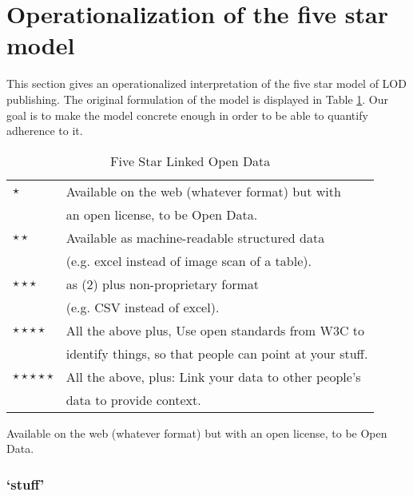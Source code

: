 \section{Operationalization of the five star model}
\label{sec:operationalization}

This section gives an operationalized interpretation of
 the five star model of LOD publishing.
The original formulation of the model \cite{Bernerslee2006}
 is displayed in Table \ref{tab:five_star}.
Our goal is to make the model concrete enough in order to be able to
 quantify adherence to it.

\begin{table}
  \label{tab:five_star}
  \caption{Five Star Linked Open Data}
  \centering
  \begin{tabular}{|l|l|}
    \hline
        $\star$
      & Available on the web (whatever format) but with \\
      & an open license, to be Open Data.\\
    \hline
        $\star\star$
      & Available as machine-readable structured data \\
      & (e.g. excel instead of image scan of a table).\\
    \hline
        $\star\star\star$
      & as (2) plus non-proprietary format \\
      & (e.g. CSV instead of excel).\\
    \hline
        $\star\star\star\star$
      & All the above plus, Use open standards from W3C to \\
      & identify things, so that people can point at your stuff.\\
    \hline
        $\star\star\star\star\star$
      & All the above, plus: Link your data to other people's \\
      & data to provide context.\\
    \hline
  \end{tabular}
\end{table}

\begin{principle}
\label{principle:first_star}
  Available on the web (whatever format) but with an open license,
   to be Open Data.
\end{principle}

\subsubsection*{`stuff'}


